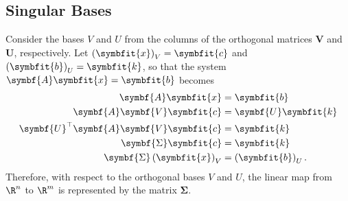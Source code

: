 \documentclass{article}
\begin{document}
\subsection{Singular Bases}
Consider the bases \(V\) and \(U\) from the columns of the orthogonal matrices \(\symbf{V}\) and \(\symbf{U}\), respectively.
Let \(\left( \symbfit{x} \right)_V = \symbfit{c}\) and \(\left( \symbfit{b} \right)_U = \symbfit{k}\),
so that the system \(\symbf{A} \symbfit{x} = \symbfit{b}\) becomes
\begin{align*}
    \symbf{A} \symbfit{x}                          & = \symbfit{b}                   \\
    \symbf{A} \symbf{V} \symbfit{c}                & = \symbf{U} \symbfit{k}         \\
    \symbf{U}^\top \symbf{A} \symbf{V} \symbfit{c} & = \symbfit{k}                   \\
    \symbf{\Sigma} \symbfit{c}                     & = \symbfit{k}                   \\
    \symbf{\Sigma} \left( \symbfit{x} \right)_V    & = \left( \symbfit{b} \right)_U.
\end{align*}
Therefore, with respect to the orthogonal bases \(V\) and \(U\), the linear map from \(\R^n\) to \(\R^m\) is represented
by the matrix \(\symbf{\Sigma}\).
\end{document}
